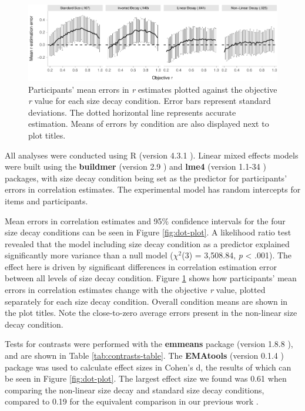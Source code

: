 \documentclass{vgtc}                          %
\begin{document}
\begin{figure}
\includegraphics[width=1\linewidth]{size_and_scatterplots_files/figure-latex/differences-plot-1} \caption{Participants' mean errors in \textit{r} estimates plotted against the objective \textit{r} value for each size decay condition. Error bars represent standard deviations. The dotted horizontal line represents accurate estimation. Means of errors by condition are also displayed next to plot titles.}\label{fig:differences-plot}
\end{figure}

All analyses were conducted using R (version 4.3.1 \cite{r_core}). Linear mixed effects models were
built using the \textbf{buildmer} (version 2.9 \cite{voeten_buildmer}) and \textbf{lme4}
(version 1.1-34 \cite{bates_lme4_2015}) packages, with size decay condition being set
as the predictor for participants' errors in correlation estimates. The experimental
model has random intercepts for items and participants.

Mean errors in correlation estimates and 95\% confidence intervals
for the four size decay conditions can be seen in Figure \ref{fig:dot-plot}.
A likelihood ratio test revealed that the model including size decay condition
as a predictor explained significantly more variance than a null model
(\(\chi^2\)(3) = 3,508.84,
\emph{p} \textless{} .001). The effect here is driven by
significant differences in correlation estimation error between all levels
of size decay condition. Figure \ref{fig:differences-plot} shows how participants' mean errors in correlation
estimates change with the objective \emph{r} value, plotted separately for each
size decay condition. Overall condition means are shown in the plot titles.
Note the close-to-zero average errors present in the non-linear size decay condition.

Tests for contrasts were performed with the \textbf{emmeans} package
(version 1.8.8 \cite{emmeans}), and are shown in Table \ref{tab:contrasts-table}.
The \textbf{EMAtools} (version 0.1.4 \cite{ematools}) package was used to calculate effect sizes in Cohen's d,
the results of which can be seen in Figure \ref{fig:dot-plot}.
The largest effect size we found was 0.61 when comparing
the non-linear size decay and standard size decay conditions, compared to
0.19 for the equivalent comparison in our previous work \cite{strain_2023}.
\end{document}
